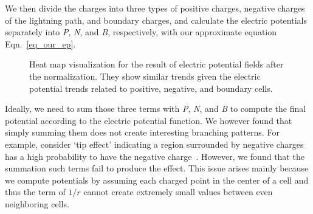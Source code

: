 
We then divide the charges into three types of positive charges, negative
charges of the lightning path, and boundary charges, and calculate the electric
potentials separately into \textit{P}, \textit{N}, and \textit{B},
respectively,  with our approximate equation Eqn.~\ref{eq_our_ep}.  


\begin{figure}[t]
	\centering
	\caption{Heat map visualization for the result of electric potential
	fields after the normalization.  They show similar trends given the
	electric potential trends related to positive, negative, and boundary
	cells.
	}
	\label{fig_comp_heatmap}
\end{figure}


Ideally, we
need to sum those three terms with \textit{P}, \textit{N}, and \textit{B}
  to compute the final potential according to the electric potential function. 
We however found that simply summing them does not create interesting branching
patterns.  For example, consider `tip effect' indicating a region surrounded by
negative charges has a high probability to have the negative
charge~\cite{Niemeyer1984}.  However, we found that the summation such terms
fail to produce the effect.  This issue arises mainly because we compute
potentials by assuming each charged point in the center of  a cell and thus the
term of $1/r$ cannot create extremely small values between even neighboring
cells.


